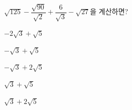 $\sqrt{125}-\dfrac{\sqrt{90}}{\sqrt{2}}+\dfrac{6}{\sqrt{3}}-\sqrt{27}$을 계산하면?
\begin{choicesii}{\rule[-3ex]{0pt}{8ex}$-2\sqrt{3}+\sqrt{5}$}{\rule[-3ex]{0pt}{8ex}$-\sqrt{3}+\sqrt{5}$}{\rule[-3ex]{0pt}{8ex}$-\sqrt{3}+2\sqrt{5}$}{\rule[-3ex]{0pt}{8ex}$\sqrt{3}+\sqrt{5}$}{\rule[-3ex]{0pt}{8ex}$\sqrt{3}+2\sqrt{5}$}\end{choicesii}
